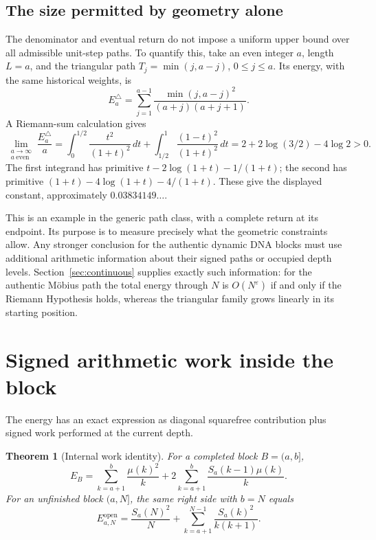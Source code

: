 \documentclass[11pt]{article}
\newtheorem{theorem}{Theorem}[section]
\theoremstyle{definition}
\theoremstyle{remark}
\begin{document}
\subsection{The size permitted by geometry alone}

The denominator and eventual return do not impose a uniform upper bound over all admissible unit-step paths. To quantify this, take an even integer $a$, length $L=a$, and the triangular path $T_j=\min(j,a-j)$, $0\le j\le a$. Its energy, with the same historical weights, is
\begin{equation}\label{eq:triangle}
E^{\triangle}_a=\sum_{j=1}^{a-1}\frac{\min(j,a-j)^2}{(a+j)(a+j+1)}.
\end{equation}
A Riemann-sum calculation gives
\begin{equation}\label{eq:triangleconst}
\lim_{\substack{a\to\infty\\ a\ \text{even}}}\frac{E^{\triangle}_a}{a}=\int_0^{1/2}\frac{t^2}{(1+t)^2}\,dt+\int_{1/2}^1\frac{(1-t)^2}{(1+t)^2}\,dt=2+2\log(3/2)-4\log2>0.
\end{equation}
The first integrand has primitive $t-2\log(1+t)-1/(1+t)$; the second has primitive $(1+t)-4\log(1+t)-4/(1+t)$. These give the displayed constant, approximately $0.03834149\ldots$.

This is an example in the generic path class, with a complete return at its endpoint. Its purpose is to measure precisely what the geometric constraints allow. Any stronger conclusion for the authentic dynamic DNA blocks must use additional arithmetic information about their signed paths or occupied depth levels. Section~\ref{sec:continuous} supplies exactly such information: for the authentic M\"obius path the total energy through $N$ is $O(N^{\varepsilon})$ if and only if the Riemann Hypothesis holds, whereas the triangular family grows linearly in its starting position.

\section{Signed arithmetic work inside the block}\label{sec:work}

The energy has an exact expression as diagonal squarefree contribution plus signed work performed at the current depth.

\begin{theorem}[Internal work identity]\label{thm:work}
For a completed block $B=(a,b]$,
\begin{equation}\label{eq:work}
E_B=\sum_{k=a+1}^b\frac{\mu(k)^2}{k}+2\sum_{k=a+1}^b\frac{S_a(k-1)\mu(k)}{k}.
\end{equation}
For an unfinished block $(a,N]$, the same right side with $b=N$ equals
\begin{equation}\label{eq:openenergy}
E^{\mathrm{open}}_{a,N}=\frac{S_a(N)^2}{N}+\sum_{k=a+1}^{N-1}\frac{S_a(k)^2}{k(k+1)}.
\end{equation}
\end{theorem}
\end{document}
